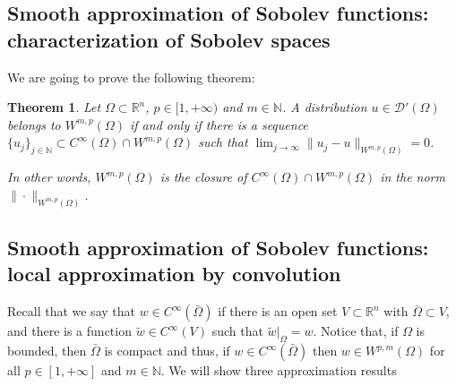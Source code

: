 \documentclass[a4paper,9pt]{amsart}
\newcommand{\scr}[1]{\mathscr{#1}}
\newcommand{\N}{\mathbb{N}}	%
\newcommand{\R}{\mathbb{R}}	%
\theoremstyle{plain}
\newtheorem{theorem}[proposition]{Theorem}
\theoremstyle{definition}
\theoremstyle{remark}
\begin{document}
\subsection{Smooth approximation of Sobolev functions: characterization of Sobolev spaces}
We are going to prove the following theorem:
\begin{theorem}
	Let $\Omega\subset\R^n$, $p\in[1,+\infty)$ and $m\in\N$.
	A distribution $u\in\scr D'(\Omega)$ belongs to $W^{m,p}(\Omega)$ if and only if there is a sequence $\{u_j\}_{j\in\N}\subset C^\infty(\Omega)\cap W^{m,p}(\Omega)$ such that $\lim_{j\to\infty} \|u_j-u\|_{W^{m,p}(\Omega)} = 0$.
	
	In other words, $W^{m,p}(\Omega)$ is the closure of $C^\infty(\Omega)\cap W^{m,p}(\Omega)$ in the norm $\|\cdot\|_{W^{m,p}(\Omega)}$.
\end{theorem}

\subsection{Smooth approximation of Sobolev functions: local approximation by convolution}

Recall that we say that $w\in C^\infty(\bar\Omega)$ if there is an open set $V\subset\R^n$ with $\bar\Omega\subset V$, and there is a function $\tilde w\in C^\infty(V)$ such that $\tilde w|_{\Omega}=w$.
Notice that, if $\Omega$ is bounded, then $\bar \Omega$ is compact and thus, if  $w\in C^\infty(\bar\Omega)$ then $w\in W^{p,m}(\Omega)$ for all $p\in[1,+\infty]$ and $m\in\N$.
We will show three approximation results 
\end{document}
